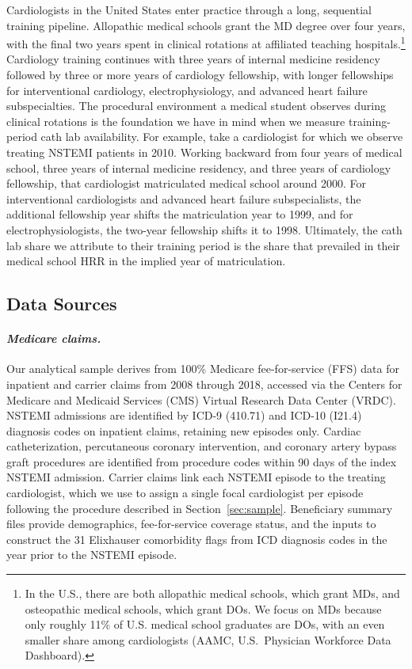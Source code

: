 \documentclass[12pt]{article}
\begin{document}
Cardiologists in the United States enter practice through a long, sequential training pipeline. Allopathic medical schools grant the MD degree over four years, with the final two years spent in clinical rotations at affiliated teaching hospitals.\footnote{In the U.S., there are both allopathic medical schools, which grant MDs, and osteopathic medical schools, which grant DOs. We focus on MDs because only roughly 11\% of U.S. medical school graduates are DOs, with an even smaller share among cardiologists (AAMC, U.S.\ Physician Workforce Data Dashboard).} Cardiology training continues with three years of internal medicine residency followed by three or more years of cardiology fellowship, with longer fellowships for interventional cardiology, electrophysiology, and advanced heart failure subspecialties. The procedural environment a medical student observes during clinical rotations is the foundation we have in mind when we measure training-period cath lab availability. For example, take a cardiologist for which we observe treating NSTEMI patients in 2010. Working backward from four years of medical school, three years of internal medicine residency, and three years of cardiology fellowship, that cardiologist matriculated medical school around 2000. For interventional cardiologists and advanced heart failure subspecialists, the additional fellowship year shifts the matriculation year to 1999, and for electrophysiologists, the two-year fellowship shifts it to 1998. Ultimately, the cath lab share we attribute to their training period is the share that prevailed in their medical school HRR in the implied year of matriculation.

\subsection{Data Sources}

\paragraph{\textit{Medicare claims.}}
Our analytical sample derives from 100\% Medicare fee-for-service (FFS) data for inpatient and carrier claims from 2008 through 2018, accessed via the Centers for Medicare and Medicaid Services (CMS) Virtual Research Data Center (VRDC). NSTEMI admissions are identified by ICD-9 (410.71) and ICD-10 (I21.4) diagnosis codes on inpatient claims, retaining new episodes only. Cardiac catheterization, percutaneous coronary intervention, and coronary artery bypass graft procedures are identified from procedure codes within 90 days of the index NSTEMI admission. Carrier claims link each NSTEMI episode to the treating cardiologist, which we use to assign a single focal cardiologist per episode following the procedure described in Section~\ref{sec:sample}. Beneficiary summary files provide demographics, fee-for-service coverage status, and the inputs to construct the 31 Elixhauser comorbidity flags from ICD diagnosis codes in the year prior to the NSTEMI episode.
\end{document}
